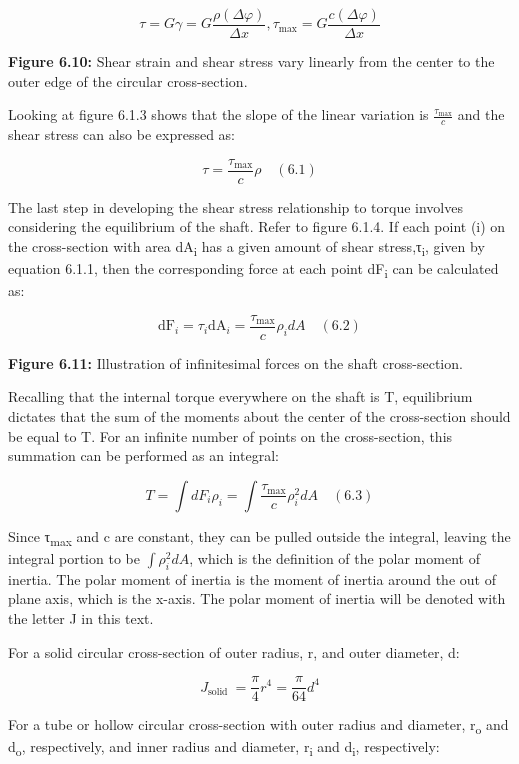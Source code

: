 \documentclass[
  letterpaper,
  DIV=11,
  numbers=noendperiod]{scrreprt}
\begin{document}
\[
\tau=G \gamma=G \frac{\rho(\Delta \varphi)}{\Delta x}, \tau_{\max }=G \frac{c(\Delta \varphi)}{\Delta x}
\]

\textbf{Figure 6.10:} Shear strain and shear stress vary linearly from
the center to the outer edge of the circular cross-section.

Looking at figure 6.1.3 shows that the slope of the linear variation is
\(\frac{\tau_{\max }}{c}\) and the shear stress can also be expressed
as:

\[
\tau=\frac{\tau_{\max }}{c} \rho\quad(6.1)
\]

The last step in developing the shear stress relationship to torque
involves considering the equilibrium of the shaft. Refer to figure
6.1.4. If each point (i) on the cross-section with area
dA\textsubscript{i} has a given amount of shear
stress,τ\textsubscript{i}, given by equation 6.1.1, then the
corresponding force at each point dF\textsubscript{i} can be calculated
as:

\[
\mathrm{dF}_i=\tau_i \mathrm{dA}_i=\frac{\tau_{\max }}{c} \rho_i d A\quad(6.2)
\]

\textbf{Figure 6.11:} Illustration of infinitesimal forces on the shaft
cross-section.

Recalling that the internal torque everywhere on the shaft is T,
equilibrium dictates that the sum of the moments about the center of the
cross-section should be equal to T. For an infinite number of points on
the cross-section, this summation can be performed as an integral:

\[
T=\int d F_i \rho_i=\int \frac{\tau_{\max }}{c} \rho_i^2 d A\quad(6.3)
\]

Since τ\textsubscript{max} and c are constant, they can be pulled
outside the integral, leaving the integral portion to be
\(\int \rho_i^2 d A\), which is the definition of the polar moment of
inertia. The polar moment of inertia is the moment of inertia around the
out of plane axis, which is the x-axis. The polar moment of inertia will
be denoted with the letter J in this text.

For a solid circular cross-section of outer radius, r, and outer
diameter, d:

\[
J_{\text {solid }}=\frac{\pi}{4} r^4=\frac{\pi}{64} d^4
\]

For a tube or hollow circular cross-section with outer radius and
diameter, r\textsubscript{o} and d\textsubscript{o}, respectively, and
inner radius and diameter, r\textsubscript{i} and d\textsubscript{i},
respectively:
\end{document}
